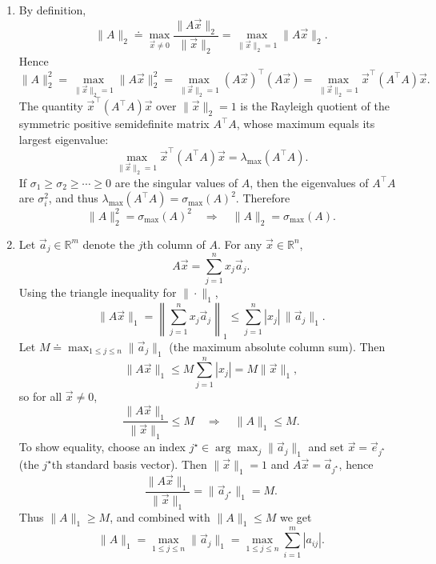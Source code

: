 \documentclass[
  12pt,
]{fphw}
\begin{document}
\begin{enumerate}
\item[(a)] By definition,
\[
\|A\|_2 \doteq \max_{\vec x\neq 0}\frac{\|A\vec x\|_2}{\|\vec x\|_2}
= \max_{\|\vec x\|_2=1}\|A\vec x\|_2.
\]
Hence
\[
\|A\|_2^2
= \max_{\|\vec x\|_2=1}\|A\vec x\|_2^2
= \max_{\|\vec x\|_2=1} (A\vec x)^\top (A\vec x)
= \max_{\|\vec x\|_2=1} \vec x^\top (A^\top A)\vec x.
\]
The quantity $\vec x^\top (A^\top A)\vec x$ over $\|\vec x\|_2=1$ is the Rayleigh quotient of the symmetric
positive semidefinite matrix $A^\top A$, whose maximum equals its largest eigenvalue:
\[
\max_{\|\vec x\|_2=1} \vec x^\top (A^\top A)\vec x = \lambda_{\max}(A^\top A).
\]
If $\sigma_1\ge \sigma_2\ge \cdots \ge 0$ are the singular values of $A$, then the eigenvalues of $A^\top A$
are $\sigma_i^2$, and thus $\lambda_{\max}(A^\top A)=\sigma_{\max}(A)^2$. Therefore
\[
\|A\|_2^2 = \sigma_{\max}(A)^2
\quad\Longrightarrow\quad
\|A\|_2 = \sigma_{\max}(A).
\]

\item[(b)] Let $\vec a_j\in\mathbb{R}^m$ denote the $j$th column of $A$. For any $\vec x\in\mathbb{R}^n$,
\[
A\vec x = \sum_{j=1}^n x_j \vec a_j.
\]
Using the triangle inequality for $\|\cdot\|_1$,
\[
\|A\vec x\|_1
= \left\|\sum_{j=1}^n x_j \vec a_j\right\|_1
\le \sum_{j=1}^n |x_j|\,\|\vec a_j\|_1.
\]
Let $M \doteq \max_{1\le j\le n}\|\vec a_j\|_1$ (the maximum absolute column sum). Then
\[
\|A\vec x\|_1 \le M\sum_{j=1}^n |x_j| = M\|\vec x\|_1,
\]
so for all $\vec x\neq 0$,
\[
\frac{\|A\vec x\|_1}{\|\vec x\|_1} \le M
\quad\Longrightarrow\quad
\|A\|_1 \le M.
\]
To show equality, choose an index $j^\star \in \arg\max_j \|\vec a_j\|_1$ and set $\vec x = \vec e_{j^\star}$
(the $j^\star$th standard basis vector). Then $\|\vec x\|_1=1$ and $A\vec x = \vec a_{j^\star}$, hence
\[
\frac{\|A\vec x\|_1}{\|\vec x\|_1} = \|\vec a_{j^\star}\|_1 = M.
\]
Thus $\|A\|_1 \ge M$, and combined with $\|A\|_1\le M$ we get
\[
\|A\|_1 = \max_{1\le j\le n}\|\vec a_j\|_1 = \max_{1\le j\le n}\sum_{i=1}^m |a_{ij}|.
\]


\end{enumerate}
\end{document}

